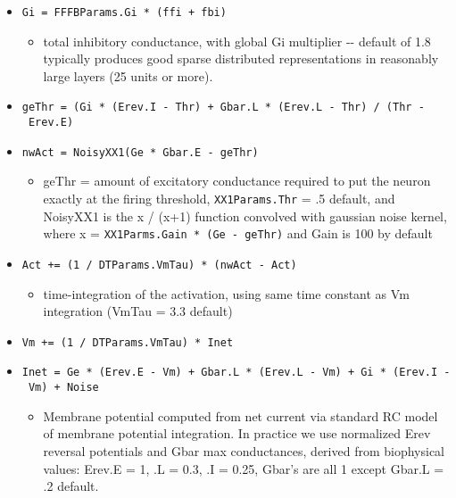 \documentclass[10pt,letterpaper]{article}
\begin{document}
\begin{itemize}
  \item \texttt{Gi\ =\ FFFBParams.Gi\ *\ (ffi\ +\ fbi)}

    \begin{itemize}
	
    \item
      total inhibitory conductance, with global Gi multiplier -\/-
      default of 1.8 typically produces good sparse distributed
      representations in reasonably large layers (25 units or more).
    \end{itemize}
	
  \item \texttt{geThr\ =\ (Gi\ *\ (Erev.I\ -\ Thr)\ +\ Gbar.L\ *\ (Erev.L\ -\ Thr)\ /\ (Thr\ -\ Erev.E)}

  \item \texttt{nwAct\ =\ NoisyXX1(Ge\ *\ Gbar.E\ -\ geThr)}

    \begin{itemize}
	
    \item
      geThr = amount of excitatory conductance required to put the
      neuron exactly at the firing threshold, \texttt{XX1Params.Thr} =
      .5 default, and NoisyXX1 is the x / (x+1) function convolved with
      gaussian noise kernel, where x = \texttt{XX1Parms.Gain * (Ge - geThr)} and Gain is 100 by default
    \end{itemize}
	
  \item \texttt{Act\ +=\ (1\ /\ DTParams.VmTau)\ *\ (nwAct\ -\ Act)}

    \begin{itemize}
	
    \item
      time-integration of the activation, using same time constant as Vm
      integration (VmTau = 3.3 default)
    \end{itemize}
	
  \item \texttt{Vm\ +=\ (1\ /\ DTParams.VmTau)\ *\ Inet}

  \item \texttt{Inet\ =\ Ge\ *\ (Erev.E\ -\ Vm)\ +\ Gbar.L\ *\ (Erev.L\ -\ Vm)\ +\ Gi\ *\ (Erev.I\ -\ Vm)\ +\ Noise}

    \begin{itemize}
	
    \item
      Membrane potential computed from net current via standard RC model
      of membrane potential integration. In practice we use normalized
      Erev reversal potentials and Gbar max conductances, derived from
      biophysical values: Erev.E = 1, .L = 0.3, .I = 0.25, Gbar's are
      all 1 except Gbar.L = .2 default.
    \end{itemize}
\end{itemize}
\end{document}
